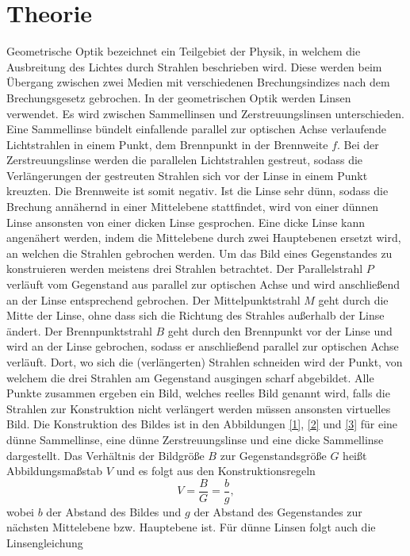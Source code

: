 \section{Theorie}
\label{sec:Theorie}

Geometrische Optik bezeichnet ein Teilgebiet der Physik, in welchem die Ausbreitung des Lichtes durch Strahlen beschrieben wird. Diese werden beim Übergang zwischen zwei Medien mit verschiedenen Brechungsindizes nach dem Brechungsgesetz gebrochen. In der geometrischen Optik werden Linsen verwendet. Es wird zwischen Sammellinsen und Zerstreuungslinsen unterschieden. Eine Sammellinse bündelt einfallende parallel zur optischen Achse verlaufende Lichtstrahlen in einem Punkt, dem Brennpunkt in der Brennweite $f$. Bei der Zerstreuungslinse werden die parallelen Lichtstrahlen gestreut, sodass die Verlängerungen der gestreuten Strahlen sich vor der Linse in einem Punkt kreuzten. Die Brennweite ist somit negativ. Ist die Linse sehr dünn, sodass die Brechung annähernd in einer Mittelebene stattfindet, wird von einer dünnen Linse ansonsten von einer dicken Linse gesprochen. Eine dicke Linse kann angenähert werden, indem die Mittelebene durch zwei Hauptebenen ersetzt wird, an welchen die Strahlen gebrochen werden. Um das Bild eines Gegenstandes zu konstruieren werden meistens drei Strahlen betrachtet. Der Parallelstrahl $P$ verläuft vom Gegenstand aus parallel zur optischen Achse und wird anschließend an der Linse entsprechend gebrochen. Der Mittelpunktstrahl $M$ geht durch die Mitte der Linse, ohne dass sich die Richtung des Strahles außerhalb der Linse ändert. Der Brennpunktstrahl $B$ geht durch den Brennpunkt vor der Linse und wird an der Linse gebrochen, sodass er anschließend parallel zur optischen Achse verläuft. Dort, wo sich die (verlängerten) Strahlen schneiden wird der Punkt, von welchem die drei Strahlen am Gegenstand ausgingen scharf abgebildet. Alle Punkte zusammen ergeben ein Bild, welches reelles Bild genannt wird, falls die Strahlen zur Konstruktion nicht verlängert werden müssen ansonsten virtuelles Bild. Die Konstruktion des Bildes ist in den Abbildungen \ref{1}, \ref{2} und \ref{3} für eine dünne Sammellinse, eine dünne Zerstreuungslinse und eine dicke Sammellinse dargestellt. Das Verhältnis der Bildgröße $B$ zur Gegenstandsgröße $G$ heißt Abbildungsmaßstab $V$ und es folgt aus den Konstruktionsregeln
\begin{equation}
 V = \frac{B}{G}=\frac{b}{g},\label{mast}
\end{equation}
wobei $b$ der Abstand des Bildes und $g$ der Abstand des Gegenstandes zur nächsten Mittelebene bzw. Hauptebene ist. Für dünne Linsen folgt auch die Linsengleichung
